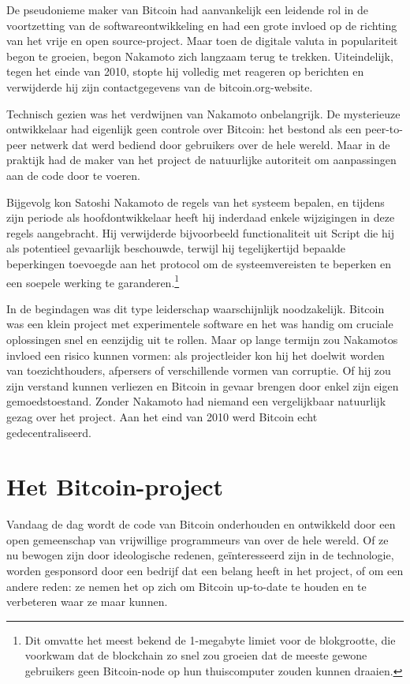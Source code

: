 \documentclass[
  a5paper,
  smalldemyvopaper,11pt,twoside,onecolumn,openright,extrafontsizes,
hidelinks]{memoir}
\begin{document}
De pseudonieme maker van Bitcoin had aanvankelijk een leidende rol in de
voortzetting van de softwareontwikkeling en had een grote invloed op de
richting van het vrije en open source-project. Maar toen de digitale
valuta in populariteit begon te groeien, begon Nakamoto zich langzaam
terug te trekken. Uiteindelijk, tegen het einde van 2010, stopte hij
volledig met reageren op berichten en verwijderde hij zijn
contactgegevens van de bitcoin.org-website.

Technisch gezien was het verdwijnen van Nakamoto onbelangrijk. De
mysterieuze ontwikkelaar had eigenlijk geen controle over Bitcoin: het
bestond als een peer-to-peer netwerk dat werd bediend door gebruikers
over de hele wereld. Maar in de praktijk had de maker van het project de
natuurlijke autoriteit om aanpassingen aan de code door te voeren.

Bijgevolg kon Satoshi Nakamoto de regels van het systeem bepalen, en
tijdens zijn periode als hoofdontwikkelaar heeft hij inderdaad enkele
wijzigingen in deze regels aangebracht. Hij verwijderde bijvoorbeeld
functionaliteit uit Script die hij als potentieel gevaarlijk beschouwde,
terwijl hij tegelijkertijd bepaalde beperkingen toevoegde aan het
protocol om de systeemvereisten te beperken en een soepele werking te
garanderen.\footnote{Dit omvatte het meest bekend de 1-megabyte limiet
  voor de blokgrootte, die voorkwam dat de blockchain zo snel zou
  groeien dat de meeste gewone gebruikers geen Bitcoin-node op hun
  thuiscomputer zouden kunnen draaien.}

In de begindagen was dit type leiderschap waarschijnlijk noodzakelijk.
Bitcoin was een klein project met experimentele software en het was
handig om cruciale oplossingen snel en eenzijdig uit te rollen. Maar op
lange termijn zou Nakamotos invloed een risico kunnen vormen: als
projectleider kon hij het doelwit worden van toezichthouders, afpersers
of verschillende vormen van corruptie. Of hij zou zijn verstand kunnen
verliezen en Bitcoin in gevaar brengen door enkel zijn eigen
gemoedstoestand. Zonder Nakamoto had niemand een vergelijkbaar natuurlijk gezag over het
project. Aan het eind van 2010 werd Bitcoin echt gedecentraliseerd.

\section{Het Bitcoin-project}\label{het-bitcoin-project}

Vandaag de dag wordt de code van Bitcoin onderhouden en ontwikkeld door
een open gemeenschap van vrijwillige programmeurs van over de hele
wereld. Of ze nu bewogen zijn door ideologische redenen, geïnteresseerd
zijn in de technologie, worden gesponsord door een bedrijf dat een
belang heeft in het project, of om een andere reden: ze nemen het op
zich om Bitcoin up-to-date te houden en te verbeteren waar ze maar
kunnen.
\end{document}
